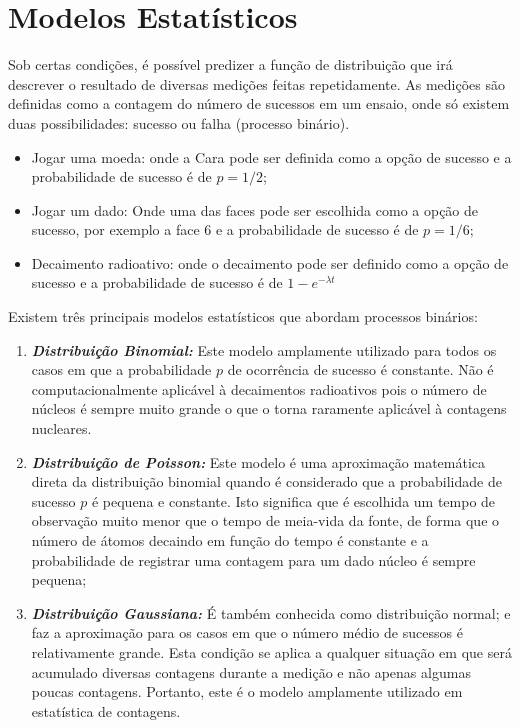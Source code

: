 \documentclass[11pt,a4paper]{article}
\newcounter{exemplo}
\begin{document}
\section{Modelos Estatísticos}

	Sob certas condições, é possível predizer a função de distribuição que irá descrever o resultado de diversas medições feitas repetidamente. As medições são definidas como a contagem do número de sucessos em um ensaio, onde só existem duas possibilidades: sucesso ou falha (processo binário).
	
	
	\begin{exemplo}

		\begin{itemize}
			\item Jogar uma moeda: onde a Cara pode ser definida como a opção de sucesso e a probabilidade de sucesso é de $p = 1/2$;
			\item Jogar um dado: Onde uma das faces pode ser escolhida como a opção de sucesso, por exemplo a face 6 e a probabilidade de sucesso é de $p = 1/6$;
			\item Decaimento radioativo: onde o decaimento pode ser definido como a opção de sucesso e a probabilidade de sucesso é de $1 - e^{-\lambda t}$
		\end{itemize}
		
	\end{exemplo}


	Existem três principais modelos estatísticos que abordam processos binários:

	\begin{enumerate}
		\item \textit{\textbf{\textcolor{CarnationPink}{Distribuição Binomial:}}} Este modelo amplamente utilizado para todos os casos em que a probabilidade $p$ de ocorrência de sucesso é constante. Não é computacionalmente aplicável à decaimentos radioativos pois o número de núcleos é sempre muito grande o que o torna raramente aplicável à contagens nucleares.
		
		\item \textit{\textbf{\textcolor{CarnationPink}{Distribuição de Poisson:}}} Este modelo é uma aproximação matemática direta da distribuição binomial quando é considerado que a probabilidade de sucesso $p$ é pequena e constante. Isto significa que é escolhida um tempo de observação muito menor que o tempo de meia-vida da fonte, de forma que o número de átomos decaindo em função do tempo é constante e a probabilidade de registrar uma contagem para um dado núcleo é sempre pequena;
		
		\item \textit{\textbf{\textcolor{CarnationPink}{Distribuição Gaussiana:}}} É também conhecida como distribuição normal; e faz a aproximação para os casos em que o número médio de sucessos é relativamente grande. Esta condição se aplica a qualquer situação em que será acumulado diversas contagens durante a medição e não apenas algumas poucas contagens. Portanto, este é o modelo amplamente utilizado em estatística de contagens.		
	\end{enumerate}
\end{document}
